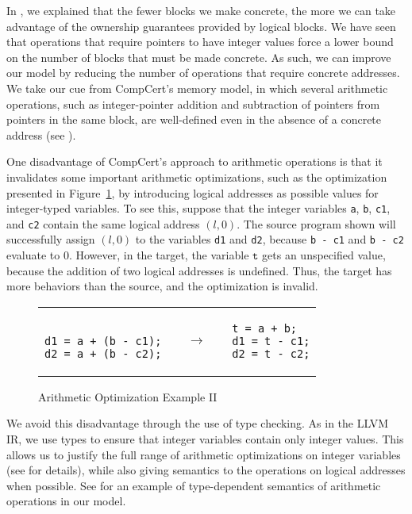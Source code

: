 In , we explained that the fewer blocks we make concrete, the more we can take advantage of the ownership guarantees provided by logical blocks. We have seen that operations that require pointers to have integer values force a lower bound on the number of blocks that must be made concrete. As such, we can improve our model by reducing the number of operations that require concrete addresses. We take our cue from CompCert's memory model, in which several arithmetic operations, such as integer-pointer addition and subtraction of pointers from pointers in the
same block, are well-defined even in the absence of a concrete address (see ). 

One disadvantage of CompCert's approach to arithmetic operations is that it invalidates some important arithmetic optimizations, such as the optimization presented in Figure~\ref{code:arith2}, by introducing logical addresses as possible values for integer-typed variables. 
To see this, suppose that the integer variables \texttt{a}, \texttt{b}, \texttt{c1}, and \texttt{c2} contain the same logical address $(l,0)$. The source program shown will successfully assign $(l,0)$ to the variables \texttt{d1} and \texttt{d2}, because \texttt{b - c1} and \texttt{b - c2} evaluate to $0$. However, in the target, the variable $\texttt{t}$ gets an unspecified value, because the addition of two logical addresses is undefined. Thus, the target has more behaviors than the source, and the optimization is invalid.

\begin{figure}[t]
\center
\begin{tabular}{lll}
\begin{lstlisting}

d1 = a + (b - c1);
d2 = a + (b - c2);
\end{lstlisting}
&
$\quad\rightarrow\quad$
&
\begin{lstlisting}
t = a + b;
d1 = t - c1;
d2 = t - c2;
\end{lstlisting}
\end{tabular}
\caption{Arithmetic Optimization Example II}\label{code:arith2}
\end{figure}

We avoid this disadvantage through the use of type checking. 
As in the LLVM IR, we use types to ensure that integer variables contain only integer values.
This allows us to justify the full range of arithmetic optimizations on integer variables (see  for details), 
while also giving semantics to the operations on logical addresses when possible.
See  for an example of type-dependent semantics of arithmetic operations in our model.

